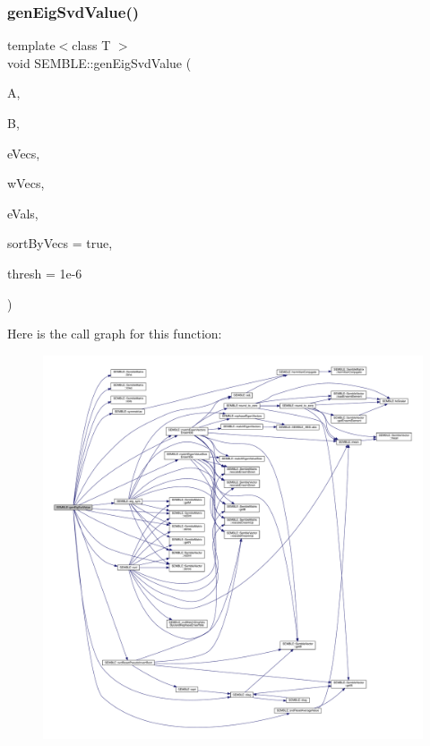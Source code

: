 \subsubsection{\texorpdfstring{genEigSvdValue()}{genEigSvdValue()}}
{\footnotesize\ttfamily template$<$class T $>$ \\
void S\+E\+M\+B\+L\+E\+::gen\+Eig\+Svd\+Value (\begin{DoxyParamCaption}\item[{const \mbox{\hyperlink{structSEMBLE_1_1SembleMatrix}{Semble\+Matrix}}$<$ T $>$ \&}]{A,  }\item[{const \mbox{\hyperlink{structSEMBLE_1_1SembleMatrix}{Semble\+Matrix}}$<$ T $>$ \&}]{B,  }\item[{\mbox{\hyperlink{structSEMBLE_1_1SembleMatrix}{Semble\+Matrix}}$<$ T $>$ \&}]{e\+Vecs,  }\item[{\mbox{\hyperlink{structSEMBLE_1_1SembleMatrix}{Semble\+Matrix}}$<$ T $>$ \&}]{w\+Vecs,  }\item[{\mbox{\hyperlink{structSEMBLE_1_1SembleVector}{Semble\+Vector}}$<$ double $>$ \&}]{e\+Vals,  }\item[{const bool}]{sort\+By\+Vecs = {\ttfamily true},  }\item[{const double}]{thresh = {\ttfamily 1e-\/6} }\end{DoxyParamCaption})}

Here is the call graph for this function\+:
\nopagebreak
\begin{figure}[H]
\begin{center}
\leavevmode
\includegraphics[width=350pt]{d7/dfd/namespaceSEMBLE_ad47fd10bab63a835bef0e6fa42868f83_cgraph}
\end{center}
\end{figure}
\mbox{\label{namespaceSEMBLE_ad20cc941d312a015ac7af98d54a39c9d}} 
